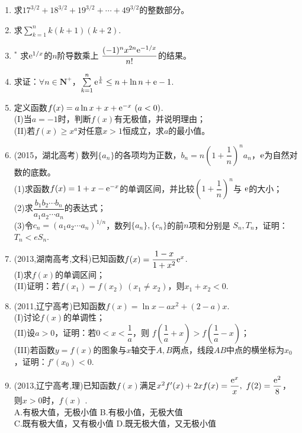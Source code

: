 \begin{enumerate}[label={\textbf{\arabic*.}},leftmargin=
    \inteval{\myenumleftmargin}pt]
\item 求$ 17^{3/2}+18^{3/2}+19^{3/2}+\cdots + 49^{3/2} $的整数部分。

\item 求$ \sum\limits_{k=1}^n k(k+1)(k+2) $.

\item $ ^* $ 求$ \mathrm{e}^{1/x} $的$ n $阶导数乘上
$ \dfrac{(-1)^nx^{2n}\mathrm{e}^{-1/x}}{n!} $的结果。

\item 求证：$ \forall n\in \textbf{N}^+ $，$ \sum\limits_{k=1}^{n} 
\mathrm{e}^{\frac{1}{k}}\leq n+\ln n+\mathrm{e} -1 $. 

\item 定义函数$ f(x)=a\ln x+x+\e^{-x} \ (a<0) $. \\
(I)当$ a=-1 $时，判断$ f(x) $有无极值，并说明理由；\\
(II)若$ f(x)\geq x^a $对任意$ x>1 $恒成立，求$ a $的最小值。

\item (2015，湖北高考) 数列$ \{a_n\} $的各项均为正数，$ b_n=n\left(1+\dfrac{1}{n}\right)^na_n $，$ \mathrm{e} $为自然对数的底数。\\
(1)求函数$ f(x)=1+x-\mathrm{e}^{-x} $的单调区间，并比较$ \left(1+\dfrac{1}{n}\right)^n $与
$ \mathrm{e} $的大小；\\
(2)求$ \dfrac{b_1b_2\cdots b_n}{a_1a_2\cdots a_n} $的表达式；\\
(3)令$ c_n=(a_1a_2\cdots a_n)^{1/n} $，数列$ \{a_n\},\{c_n\} $的前$ n $项和分别是
$ S_n,T_n $，证明：$ T_n<eS_n $.

\item (2013,湖南高考,文科)已知函数$ f(x)=\dfrac{1-x}{1+x^2}\mathrm{e}^x $.\\
(I)求$ f(x) $的单调区间；\\
(II)证明：若$ f(x_1)=f(x_2)\ (x_1\neq x_2) $，则$ x_1+x_2<0 $. 

\item (2011,辽宁高考)已知函数$ f(x)=\ln x-ax^2+(2-a)x $.\\
(I)讨论$ f(x) $的单调性；\\
(II)设$ a>0 $，证明：若$ 0<x<\dfrac{1}{a} $，则
$ f\left(\dfrac{1}{a}+x\right)>f\left(\dfrac{1}{a}-x\right) $；\\
(III)若函数$ y=f(x) $的图象与$ x $轴交于$ A,B $两点，线段$ AB $中点的横坐标为$ x_0 $，证明：$ f'(x_0)<0 $. 

\item (2013,辽宁高考,理)已知函数$ f(x) $满足$ x^2f'(x)+2xf(x)=\dfrac{\e^x}{x},\ f(2)=\dfrac{\e^2}{8} $，则$ x>0 $时，$ f(x) $ \underline{\hspace{2cm}}. \\
A.有极大值，无极小值 \hspace{2cm}     B.有极小值，无极大值\\
C.既有极大值，又有极小值\hspace{1.4cm}  D.既无极大值，又无极小值


\end{enumerate}
